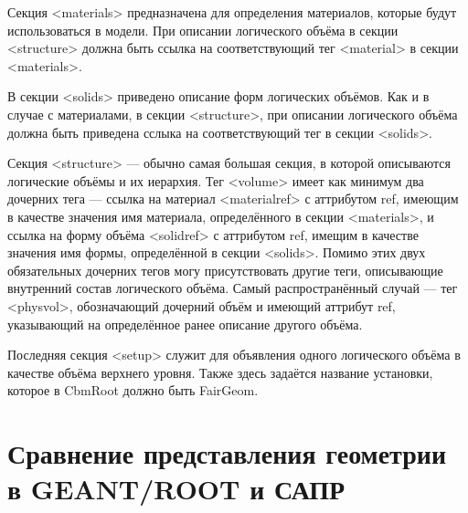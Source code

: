 Секция <materials> предназначена для определения материалов, которые будут использоваться в модели. При описании логического объёма в секции <structure> должна быть ссылка на соответствующий тег <material> в секции <materials>.

В секции <solids> приведено описание форм логических объёмов. Как и в случае с материалами, в секции <structure>, при описании логического объёма должна быть приведена сслыка на соответствующий тег в секции <solids>.

Секция <structure> --- обычно самая большая секция, в которой описываются логические объёмы и их иерархия. Тег <volume> имеет как минимум два дочерних тега --- ссылка на материал <materialref> с аттрибутом ref, имеющим в качестве значения имя материала, определённого в секции <materials>, и ссылка на форму объёма <solidref> с аттрибутом ref, имещим в качестве значения имя формы, определённой в секции <solids>. Помимо этих двух обязательных дочерних тегов могу присутствовать другие теги, описывающие внутренний состав логического объёма. Самый распространённый случай --- тег <physvol>, обозначающий дочерний объём и имеющий аттрибут ref, указывающий на определённое ранее описание другого объёма.

Последняя секция <setup> служит для объявления одного логического объёма в качестве объёма верхнего уровня. Также здесь задаётся название установки, которое в CbmRoot должно быть FairGeom.

%                                                       

\section{Сравнение представления геометрии в GEANT/ROOT и САПР}\label{sec:secROOTvsCAD}

